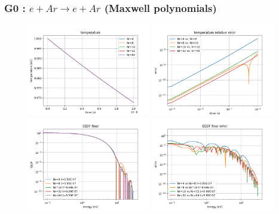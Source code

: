 \documentclass[mathserif, aspectratio=169]{beamer}
\begin{document}
	\begin{frame}
		\frametitle{G0 : $e + Ar \rightarrow e + Ar$ (Maxwell polynomials)}
		\begin{figure}
			\only<+>
			{
				\includegraphics[width=0.48\textwidth]{g0_mw_temp.png}
				\includegraphics[width=0.48\textwidth]{g0_mw_temp_error.png}
			}
			\only<+>
			{
				\includegraphics[width=0.48\textwidth]{g0_mw_eedf_final.png}
				\includegraphics[width=0.48\textwidth]{g0_mw_eedf_final_error.png}
			}
		\end{figure}
	\end{frame}
\end{document}

